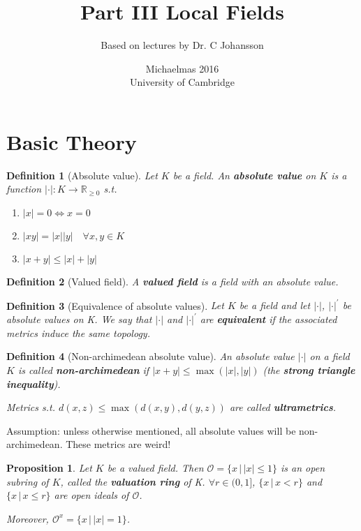 \documentclass[a4paper]{article}
\title{Part III Local Fields}
\author{Based on lectures by Dr. C Johansson}
\date{Michaelmas 2016\\University of Cambridge}
\newtheorem*{definition}{Definition}
\newtheorem{prop}{Proposition}
\newcommand*\abs[1]{|#1|}
\begin{document}
\maketitle
\tableofcontents

\section{Basic Theory}
\begin{definition}[Absolute value]
	Let $K$ be a field. An \textbf{absolute value} on $K$ is a function $\abs{\cdot}:K\to\mathbb{R}_{\geq 0}$ s.t.
	\begin{enumerate}[label=\roman*.]
		\item $\abs{x}=0 \iff x=0$
		\item $\abs{xy}=\abs{x}\abs{y} \quad \forall x,y \in K$
		\item $\abs{x+y} \leq \abs{x} + \abs{y}$
	\end{enumerate}
\end{definition}

\begin{definition}[Valued field]
	A \textbf{valued field} is a field with an absolute value.
\end{definition}

\begin{definition}[Equivalence of absolute values]
	Let $K$ be a field and let $\abs{\cdot}$, $\abs{\cdot}^{'}$ be absolute values on K. We say that $\abs{\cdot}$ and $\abs{\cdot}^{'}$ are \textbf{equivalent} if the associated metrics induce the same topology.
\end{definition}

\begin{definition}[Non-archimedean absolute value]
	An absolute value $\abs{\cdot}$ on a field $K$ is called \textbf{non-archimedean} if $\abs{x+y}\leq\max(\abs{x},\abs{y})$ (the \textbf{strong triangle inequality}).
	
	Metrics s.t. $d(x,z)\leq\max(d(x,y),d(y,z))$ are called \textbf{ultrametrics}.
\end{definition}

Assumption: unless otherwise mentioned, all absolute values will be non-archimedean. These metrics are weird!

\begin{prop}
	Let $K$ be a valued field. Then $\mathcal{O}=\{x \,|\, \abs{x}\leq 1\}$ is an open subring of $K$, called the \textbf{valuation ring} of K. $\forall r \in (0,1]$, $\{x \,|\, x < r\}$ and $\{x \,|\, x \leq r\}$ are open ideals of $\mathcal{O}$.
	
	Moreover, $\mathcal{O}^x = \{x \,|\, \abs{x}=1\}$.
\end{prop}
\end{document}
